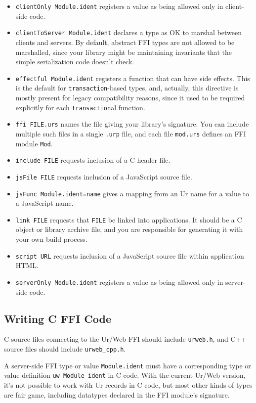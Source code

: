 \documentclass{article}
\begin{document}
\begin{itemize}
\item \texttt{clientOnly Module.ident} registers a value as being allowed only in client-side code.
\item \texttt{clientToServer Module.ident} declares a type as OK to marshal between clients and servers.  By default, abstract FFI types are not allowed to be marshalled, since your library might be maintaining invariants that the simple serialization code doesn't check.
\item \texttt{effectful Module.ident} registers a function that can have side effects.  This is the default for \texttt{transaction}-based types, and, actually, this directive is mostly present for legacy compatibility reasons, since it used to be required explicitly for each \texttt{transaction}al function.
\item \texttt{ffi FILE.urs} names the file giving your library's signature.  You can include multiple such files in a single \texttt{.urp} file, and each file \texttt{mod.urs} defines an FFI module \texttt{Mod}.
\item \texttt{include FILE} requests inclusion of a C header file.
\item \texttt{jsFile FILE} requests inclusion of a JavaScript source file.
\item \texttt{jsFunc Module.ident=name} gives a mapping from an Ur name for a value to a JavaScript name.
\item \texttt{link FILE} requests that \texttt{FILE} be linked into applications.  It should be a C object or library archive file, and you are responsible for generating it with your own build process.
\item \texttt{script URL} requests inclusion of a JavaScript source file within application HTML.
\item \texttt{serverOnly Module.ident} registers a value as being allowed only in server-side code.
\end{itemize}

\subsection{Writing C FFI Code}

C source files connecting to the Ur/Web FFI should include \texttt{urweb.h}, and C++ source files should include \texttt{urweb\_cpp.h}.

A server-side FFI type or value \texttt{Module.ident} must have a corresponding type or value definition \texttt{uw\_Module\_ident} in C code.  With the current Ur/Web version, it's not possible to work with Ur records in C code, but most other kinds of types are fair game, including datatypes declared in the FFI module's signature.
\end{document}
